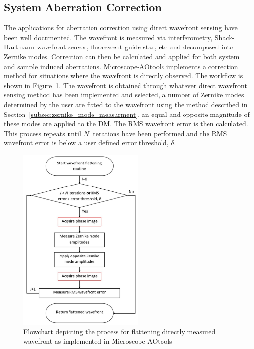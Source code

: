 \subsection{System Aberration Correction}
\label{subsec:system_correction}

The applications for aberration correction using direct wavefront sensing 
have been well documented. The wavefront is measured via interferometry, 
Shack-Hartmann wavefront sensor, fluorescent guide star, etc and decomposed 
into Zernike modes. Correction can then be calculated and applied for both 
system and sample induced aberrations. Microscope-AOtools implements a 
correction method for situations where the wavefront is directly observed. 
The workflow is shown in 
Figure~\ref{fig:direct_wavefront_flattening_workflow}. The wavefront is 
obtained through whatever direct wavefront sensing method has been 
implemented and selected, a number of Zernike modes determined by the user 
are fitted to the wavefront using the method described in 
Section~\ref{subsec:zernike_mode_measurment}, an equal and opposite magnitude 
of these modes are applied to the DM. The RMS wavefront error is then 
calculated. This process repeats until $N$ iterations have been performed and
the RMS wavefront error is below a user defined error threshold, $\delta$.

\begin{figure}[h]
	\centering
	\includegraphics[width=0.55\textwidth, scale=0.5]{./images/direct_wavefront_flattening_workflow.jpg}
	\caption[Direct wavefront correction workflow]{Flowchart depicting the process for flattening directly measured wavefront as implemented in Microscope-AOtools}
	\label{fig:direct_wavefront_flattening_workflow}
\end{figure}


